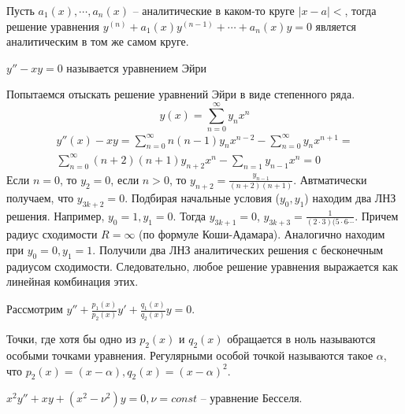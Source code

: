 \documentclass[document.tex]{subfiles}
\begin{document}
\begin{theorem}
    Пусть $a_1(x), \cdots, a_n(x)$ -- аналитические в каком-то круге $|x - a| < $, тогда решение уравнения $y^{(n)} +
    a_1(x) y^{(n - 1)} + \cdots + a_n(x) y = 0$ является аналитическим в том же самом круге.
\end{theorem}

\begin{definition}
    $y'' - xy = 0$ называется уравнением Эйри
\end{definition}

\begin{example}
    Попытаемся отыскать решение уравнений Эйри в виде степенного ряда.
    \[
        y(x) = \sum_{n = 0}^{\infty} y_n x^n
    \]
    \begin{multline*}
        y''(x) - xy = \sum_{n = 0}^{\infty} n(n - 1)y_n x^{n - 2} - \sum_{n = 0}^{\infty}y_n x^{n + 1} = \\
        \sum_{n = 0}^{\infty} (n+2)(n+1)y_{n+2} x^{n} - \sum_{n = 1} y_{n - 1} x^{n} = 0
    \end{multline*}
    Если $n = 0$, то $y_{2} = 0$, если $n > 0$, то $y_{n + 2} = \frac{y_{n - 1}}{(n + 2)(n + 1)}$. Автматически
    получаем, что $y_{3k + 2} = 0$. Подбирая начальные условия ($y_0, y_1$) находим два ЛНЗ решения.
    Например, $y_0 = 1, y_1 = 0$. Тогда $y_{3k + 1} = 0$, $y_{3k + 3} = \frac{1}{(2 \cdot 3)(5 \cdot 6 \cdots}$. Причем
    радиус сходимости $R = \infty$ (по формуле Коши-Адамара). Аналогично находим при $y_0 = 0, y_1 = 1$. Получили два
    ЛНЗ аналитических решения с бесконечным радиусом сходимости. Следовательно, любое решение уравнения выражается как
    линейная комбинация этих.
\end{example}

Рассмотрим $y'' + \frac{p_1(x)}{p_2(x)}y' + \frac{q_1(x)}{q_2(x)}y = 0$.

\begin{definition}
    Точки, где хотя бы одно из $p_2(x)$ и $q_2(x)$ обращается в ноль называются особыми точками уравнения. Регулярными
    особой точкой называются такое $\alpha$, что $p_2(x) = (x - \alpha), q_2(x) = (x - \alpha)^2$.
\end{definition}

\begin{definition}
    $x^2y'' + xy + (x^2 - \nu^2)y = 0, \nu = const$ -- уравнение Бесселя.
\end{definition}
\end{document}
